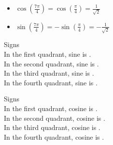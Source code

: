 \documentclass{ximera}
\begin{document}
\begin{itemize}
\item $\cos\left( \frac{7 \pi}{4} \right) = \cos\left( \frac{\pi}{4} \right) = \frac{1}{\sqrt{2}}$
\item $\sin\left( \frac{7 \pi}{4} \right) = -\sin\left( \frac{\pi}{4} \right) = -\frac{1}{\sqrt{2}}$
\end{itemize}








\begin{question} Signs \\

In the first quadrant, sine is . \\

In the second quadrant, sine is . \\

In the third quadrant, sine is . \\

In the fourth quadrant, sine is . \\

\end{question}








\begin{question} Signs \\

In the first quadrant, cosine is . \\

In the second quadrant, cosine is . \\

In the third quadrant, cosine is . \\

In the fourth quadrant, cosine is . \\

\end{question}
\end{document}
